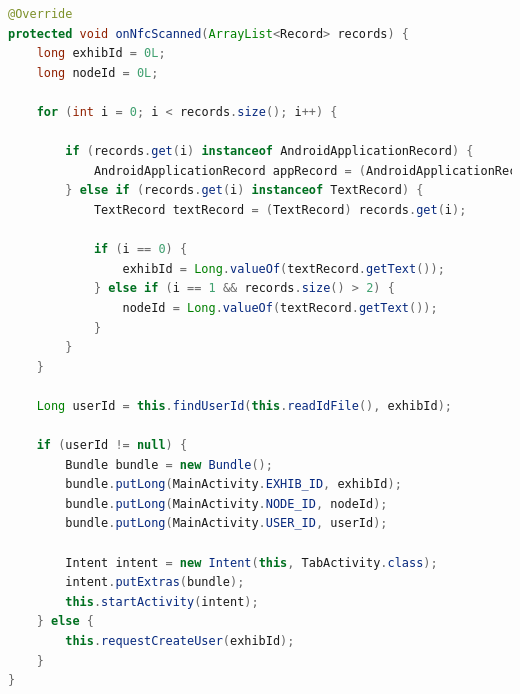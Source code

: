 \begin{lstlisting}[language=java, label=lst:onNfcScanned, caption=onNfcScanned]
@Override
protected void onNfcScanned(ArrayList<Record> records) {
    long exhibId = 0L;
    long nodeId = 0L;

    for (int i = 0; i < records.size(); i++) {

        if (records.get(i) instanceof AndroidApplicationRecord) {
            AndroidApplicationRecord appRecord = (AndroidApplicationRecord) records.get(i);
        } else if (records.get(i) instanceof TextRecord) {
            TextRecord textRecord = (TextRecord) records.get(i);

            if (i == 0) {
                exhibId = Long.valueOf(textRecord.getText());
            } else if (i == 1 && records.size() > 2) {
                nodeId = Long.valueOf(textRecord.getText());
            }
        }
    }

    Long userId = this.findUserId(this.readIdFile(), exhibId);

    if (userId != null) {
        Bundle bundle = new Bundle();
        bundle.putLong(MainActivity.EXHIB_ID, exhibId);
        bundle.putLong(MainActivity.NODE_ID, nodeId);
        bundle.putLong(MainActivity.USER_ID, userId);

        Intent intent = new Intent(this, TabActivity.class);
        intent.putExtras(bundle);
        this.startActivity(intent);
    } else {
        this.requestCreateUser(exhibId);
    }
}
\end{lstlisting}
